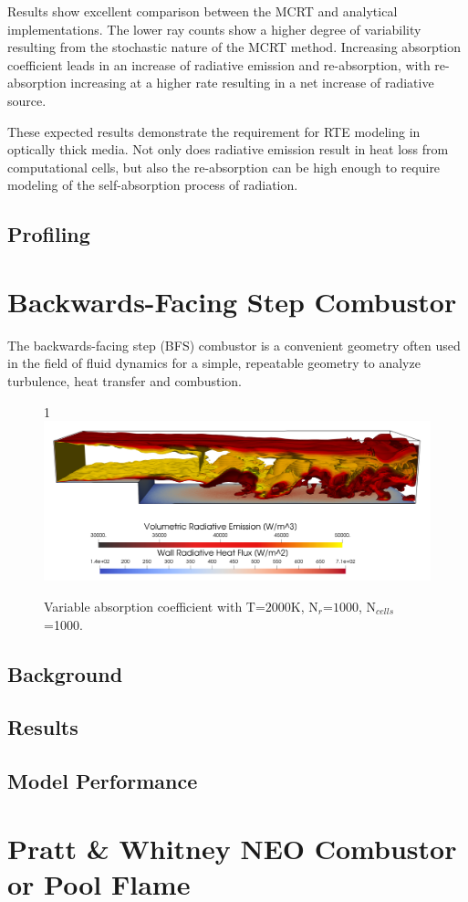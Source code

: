 Results show excellent comparison between the MCRT and analytical implementations. 
The lower ray counts show a higher degree of variability resulting from the stochastic nature of the MCRT method. 
Increasing absorption coefficient leads in an increase of radiative emission and re-absorption, with re-absorption increasing at a higher rate resulting in a net increase of radiative source.

These expected results demonstrate the requirement for RTE modeling in optically thick media. Not only does radiative emission result in heat loss from computational cells, but also the re-absorption can be high enough to require modeling of the self-absorption process of radiation.

\subsection{Profiling}


\section{Backwards-Facing Step Combustor}
The backwards-facing step (BFS) combustor is a convenient geometry often used in the field of fluid dynamics for a simple, repeatable geometry to analyze turbulence, heat transfer and combustion.

\begin{figure}{1\textwidth}
\includegraphics[width=\linewidth]{figures/ch4/BFS_volwallflux3.png}
\caption{Variable absorption coefficient with T=$2000$K, N$_r$=$1000$, N$_{cells}$=1000.}
\label{fig:BFS_geometry}
\end{figure}


\subsection{Background}
\subsection{Results}
\subsection{Model Performance}
\section{Pratt \& Whitney NEO Combustor or Pool Flame}
